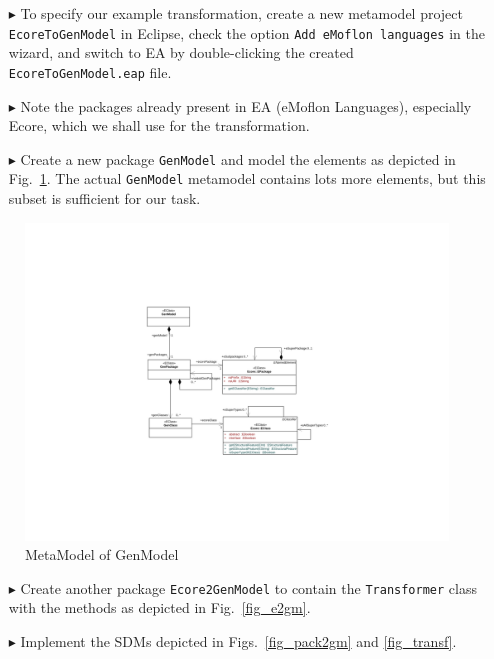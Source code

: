 \begin{enumerate}
\item[$\blacktriangleright$] To specify our example transformation, create a new metamodel project \texttt{EcoreToGenModel} in Eclipse, check the option \texttt{Add eMoflon languages} in the wizard, and switch to EA by double-clicking the created \texttt{Ecore\-To\-Gen\-Model.eap} file.
\item[$\blacktriangleright$] Note the packages already present in EA (eMoflon Languages), especially \textsf{Ecore}, which we shall use for the transformation.
\item[$\blacktriangleright$] Create a new package \texttt{GenModel} and model the elements as depicted in Fig.~\ref{fig_gMM}.
The actual \texttt{GenModel} metamodel contains lots more elements, but this subset is sufficient for our task.
\end{enumerate}
\begin{figure}[htbp]
\begin{center}  
	\includegraphics[width=1.0\textwidth]{pics/Ecore2GenModel/CDGenmodel}
	\caption{MetaModel of GenModel}  
\label{fig_gMM}
\end{center}
\end{figure} 

\begin{enumerate}  
\item[$\blacktriangleright$] Create another package \texttt{Ecore2GenModel} to contain the \texttt{Transformer} class with the methods as depicted in Fig.~\ref{fig_e2gm}.
\item[$\blacktriangleright$] Implement the SDMs depicted in Figs.~\ref{fig_pack2gm} and \ref{fig_transf}.
\end{enumerate}

